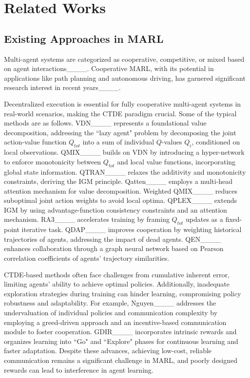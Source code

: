 \section{Related Works}
\subsection{Existing Approaches in MARL}
Multi-agent systems are categorized as cooperative, competitive, or mixed based on agent interactions____. Cooperative MARL, with its potential in applications like path planning and autonomous driving, has garnered significant research interest in recent years____.

Decentralized execution is essential for fully cooperative multi-agent systems in real-world scenarios, making the CTDE paradigm crucial. Some of the typical methods are as follows. VDN____ represents a foundational value decomposition, addressing the ``lazy agent" problem by decomposing the joint action-value function $Q_{tot}$ into a sum of individual $Q$-values $Q_i$, conditioned on local observations. QMIX____ builds on VDN by introducing a hyper-network to enforce monotonicity between $Q_{tot}$ and local value functions, incorporating global state information. QTRAN____ relaxes the additivity and monotonicity constraints, deriving the IGM principle. Qatten____ employs a multi-head attention mechanism for value decomposition. Weighted QMIX____ reduces suboptimal joint action weights to avoid local optima. QPLEX____ extends IGM by using advantage-function consistency constraints and an attention mechanism. RA3____ accelerates training by framing $Q_{tot}$ updates as a fixed-point iterative task. QDAP____ improves cooperation by weighting historical trajectories of agents, addressing the impact of dead agents. QEN____ enhances collaboration through a graph neural network based on Pearson correlation coefficients of agents’ trajectory similarities.

CTDE-based methods often face challenges from cumulative inherent error, limiting agents' ability to achieve optimal policies. Additionally, inadequate exploration strategies during training can hinder learning, compromising policy robustness and adaptability. For example, Nguyen____ addresses the undervaluation of individual policies and communication complexity by employing a greed-driven approach and an incentive-based communication module to foster cooperation. GDIR____ incorporates intrinsic rewards and organizes learning into ``Go" and ``Explore" phases for continuous learning and faster adaptation. Despite these advances, achieving low-cost, reliable communication remains a significant challenge in MARL, and poorly designed rewards can lead to interference in agent learning.

